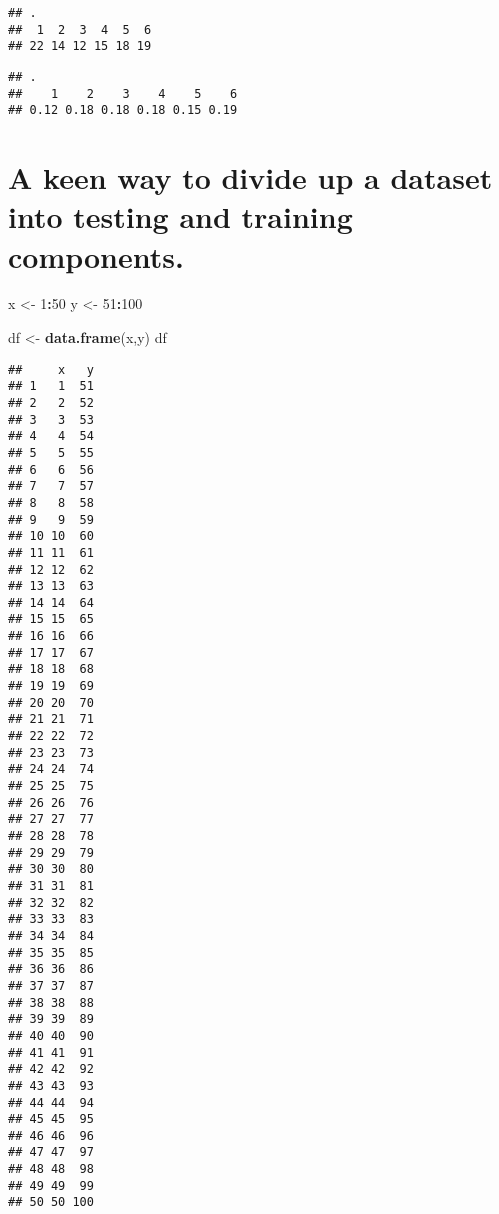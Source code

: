 \documentclass[]{book}
\newenvironment{Shaded}{\begin{snugshade}}{\end{snugshade}}
\newcommand{\DataTypeTok}[1]{\textcolor[rgb]{0.13,0.29,0.53}{#1}}
\newcommand{\DecValTok}[1]{\textcolor[rgb]{0.00,0.00,0.81}{#1}}
\newcommand{\KeywordTok}[1]{\textcolor[rgb]{0.13,0.29,0.53}{\textbf{#1}}}
\newcommand{\NormalTok}[1]{#1}
\newcommand{\OperatorTok}[1]{\textcolor[rgb]{0.81,0.36,0.00}{\textbf{#1}}}
\newcommand{\OtherTok}[1]{\textcolor[rgb]{0.56,0.35,0.01}{#1}}
\newcommand{\StringTok}[1]{\textcolor[rgb]{0.31,0.60,0.02}{#1}}
\begin{document}
\begin{verbatim}
## .
##  1  2  3  4  5  6 
## 22 14 12 15 18 19
\end{verbatim}

\begin{Shaded}
\end{Shaded}

\begin{verbatim}
## .
##    1    2    3    4    5    6 
## 0.12 0.18 0.18 0.18 0.15 0.19
\end{verbatim}

\hypertarget{a-keen-way-to-divide-up-a-dataset-into-testing-and-training-components.}{%
\section{A keen way to divide up a dataset into testing and training components.}\label{a-keen-way-to-divide-up-a-dataset-into-testing-and-training-components.}}

\begin{Shaded}
\begin{Highlighting}[]
\NormalTok{x <-}\StringTok{ }\DecValTok{1}\OperatorTok{:}\DecValTok{50}
\NormalTok{y <-}\StringTok{ }\DecValTok{51}\OperatorTok{:}\DecValTok{100}

\NormalTok{df <-}\StringTok{ }\KeywordTok{data.frame}\NormalTok{(x,y)}
\NormalTok{df}
\end{Highlighting}
\end{Shaded}

\begin{verbatim}
##     x   y
## 1   1  51
## 2   2  52
## 3   3  53
## 4   4  54
## 5   5  55
## 6   6  56
## 7   7  57
## 8   8  58
## 9   9  59
## 10 10  60
## 11 11  61
## 12 12  62
## 13 13  63
## 14 14  64
## 15 15  65
## 16 16  66
## 17 17  67
## 18 18  68
## 19 19  69
## 20 20  70
## 21 21  71
## 22 22  72
## 23 23  73
## 24 24  74
## 25 25  75
## 26 26  76
## 27 27  77
## 28 28  78
## 29 29  79
## 30 30  80
## 31 31  81
## 32 32  82
## 33 33  83
## 34 34  84
## 35 35  85
## 36 36  86
## 37 37  87
## 38 38  88
## 39 39  89
## 40 40  90
## 41 41  91
## 42 42  92
## 43 43  93
## 44 44  94
## 45 45  95
## 46 46  96
## 47 47  97
## 48 48  98
## 49 49  99
## 50 50 100
\end{verbatim}
\end{document}
